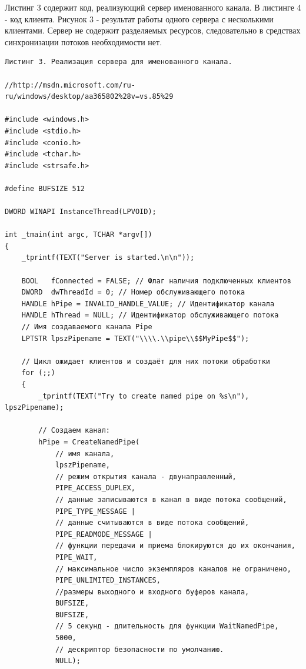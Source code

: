 \documentclass[a4paper,12pt]{article} %
\begin{document}
Листинг 3 содержит код, реализующий сервер именованного канала. В листинге 4 - код клиента. Рисунок 3 - результат работы одного сервера с несколькими клиентами. Сервер не содержит разделяемых ресурсов, следовательно в средствах синхронизации потоков необходимости нет.

\begin{verbatim}
Листинг 3. Реализация сервера для именованного канала.

//http://msdn.microsoft.com/ru-ru/windows/desktop/aa365802%28v=vs.85%29

#include <windows.h> 
#include <stdio.h> 
#include <conio.h>
#include <tchar.h>
#include <strsafe.h>

#define BUFSIZE 512

DWORD WINAPI InstanceThread(LPVOID);

int _tmain(int argc, TCHAR *argv[])
{
    _tprintf(TEXT("Server is started.\n\n"));

    BOOL   fConnected = FALSE; // Флаг наличия подключенных клиентов
    DWORD  dwThreadId = 0; // Номер обслуживающего потока
    HANDLE hPipe = INVALID_HANDLE_VALUE; // Идентификатор канала
    HANDLE hThread = NULL; // Идентификатор обслуживающего потока
    // Имя создаваемого канала Pipe
    LPTSTR lpszPipename = TEXT("\\\\.\\pipe\\$$MyPipe$$");

    // Цикл ожидает клиентов и создаёт для них потоки обработки
    for (;;)
    {
        _tprintf(TEXT("Try to create named pipe on %s\n"), lpszPipename);

        // Создаем канал:
        hPipe = CreateNamedPipe(
            // имя канала,
            lpszPipename,
            // режим открытия канала - двунаправленный,
            PIPE_ACCESS_DUPLEX,
            // данные записываются в канал в виде потока сообщений,
            PIPE_TYPE_MESSAGE |
            // данные считываются в виде потока сообщений,
            PIPE_READMODE_MESSAGE |
            // функции передачи и приема блокируются до их окончания,
            PIPE_WAIT,
            // максимальное число экземпляров каналов не ограничено,
            PIPE_UNLIMITED_INSTANCES,
            //размеры выходного и входного буферов канала,
            BUFSIZE,
            BUFSIZE,
            // 5 секунд - длительность для функции WaitNamedPipe,
            5000,
            // дескриптор безопасности по умолчанию.
            NULL);


\end{verbatim}
\end{document}
